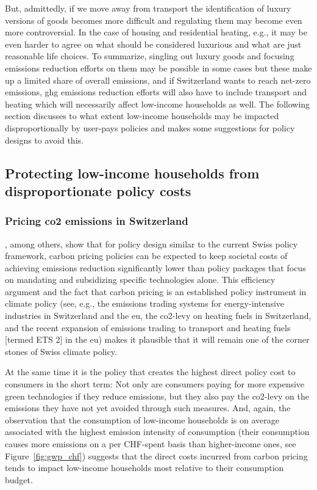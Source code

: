 \documentclass[referee, lineno, pdflatex,sn-apa]{sn-jnl}%
\theoremstyle{thmstyleone}%
\theoremstyle{thmstyletwo}%
\theoremstyle{thmstylethree}%
\begin{document}
But, admittedly, if we move away from transport the identification of luxury versions of goods becomes more difficult and regulating them may become even more controversial.
In the case of housing and residential heating, e.g., it may be even harder to agree on what should be considered luxurious and what are just reasonable life choices.
To summarize, singling out luxury goods and focusing emissions reduction efforts on them may be possible in some cases but these make up a limited share of overall emissions, and if Switzerland wants to reach net-zero emissions, \ac{ghg} emissions reduction efforts will also have to include  transport and heating which will necessarily affect low-income households as well.
The following section discusses to what extent low-income households may be impacted disproportionally by user-pays policies and makes some suggestions for policy designs to avoid this.

\subsection{Protecting low-income households from disproportionate policy costs}
\label{sec:ptp}

\subsubsection{Pricing \ac{co2} emissions in Switzerland}
\label{sec:ch_co2}

\citet{landis_efficient_2019}, among others, show that for policy design similar to the current Swiss policy framework, carbon pricing policies can be expected to keep societal costs of achieving emissions reduction significantly lower than policy packages that focus on mandating and subsidizing specific technologies alone.
This efficiency argument and the fact that carbon pricing is an established policy instrument in climate policy (see, e.g., the emissions trading systems for energy-intensive industries in Switzerland and the \ac{eu}, the \ac{co2}-levy on heating fuels in Switzerland, and the recent expansion of emissions trading to transport and heating fuels [termed ETS 2] in the \ac{eu}) makes it plausible that it will remain one of the corner stones of Swiss climate policy.

At the same time it is the policy that creates the highest direct policy cost to consumers in the short term:
Not only are consumers paying for more expensive green technologies if they reduce emissions, but they also pay the \ac{co2}-levy on the emissions they have not yet avoided through such measures.
And, again, the observation that the consumption of low-income households is on average associated with the highest emission intensity of consumption (their consumption causes more emissions on a per CHF-spent basis than higher-income ones, see Figure~\ref{fig:gwp_chf}) suggests that the direct costs incurred from carbon pricing tends to impact low-income households most relative to their consumption budget.
\end{document}
